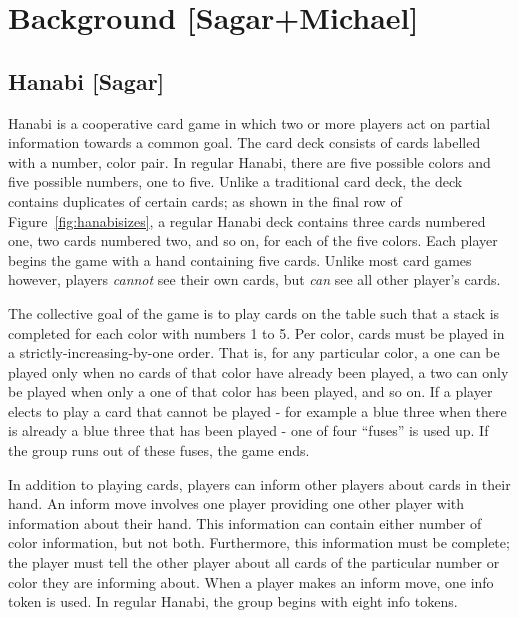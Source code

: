 \section{Background [Sagar+Michael]}
\label{sec:background}

\subsection{Hanabi [Sagar]}
\label{sec:background:hanabi}

Hanabi \cite{hanabiboardgame, hanabiwiki} is a cooperative card game in which
two or more players act on partial information towards a common goal. The
card deck consists of cards labelled with a number, color pair. In regular
Hanabi, there are five possible colors and five possible numbers, one to five.
Unlike a traditional card deck, the deck contains duplicates of certain cards;
as shown in the final row of Figure~\ref{fig:hanabisizes}, a regular Hanabi
deck contains three cards numbered one, two cards numbered two, and so on, for
each of the five colors. Each player begins the game with a hand containing
five cards. Unlike most card games however, players \emph{cannot} see their
own cards, but \emph{can} see all other player's cards.

The collective goal of the game is to play cards on the table such that a stack
is completed for each color with numbers 1 to 5. Per color, cards must be
played in a strictly-increasing-by-one order. That is, for any particular
color, a one can be played only when no cards of that color have already been
played, a two can only be played when only a one of that color has been played,
and so on.  If a player elects to play a card that cannot be played - for
example a blue three when there is already a blue three that has been played
- one of four ``fuses'' is used up. If the group runs out of these fuses, the
game ends.

In addition to playing cards, players can inform other players about cards
in their hand. An inform move involves one player providing one other player
with information about their hand. This information can contain either number
of color information, but not both. Furthermore, this information must be complete;
the player must tell the other player about all cards of the particular number or
color they are informing about. When a player makes an inform move, one info
token is used. In regular Hanabi, the group begins with eight info tokens.

